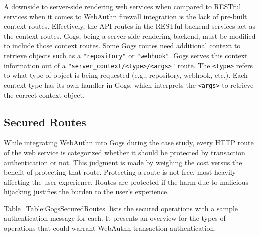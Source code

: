 A downside to server-side rendering web services when compared to RESTful services when it comes to WebAuthn firewall integration is the lack of pre-built context routes. Effectively, the API routes in the RESTful backend services act as the context routes. Gogs, being a server-side rendering backend, must be modified to include those context routes. Some Gogs routes need additional context to retrieve objects such as a \lstinline{"repository"} or \lstinline{"webhook"}. Gogs serves this context information out of a \lstinline{"server_context/<type>/<args>"} route. The \lstinline{<type>} refers to what type of object is being requested (e.g., repository, webhook, etc.). Each context type has its own handler in Gogs, which interprets the \lstinline{<args>} to retrieve the correct context object.


\subsection{Secured Routes}

While integrating WebAuthn into Gogs during the case study, every HTTP route of the web service is categorized whether it should be protected by transaction authentication or not. This judgment is made by weighing the cost versus the benefit of protecting that route. Protecting a route is not free, most heavily affecting the user experience. Routes are protected if the harm due to malicious hijacking justifies the burden to the user's experience.

Table~\ref{Table:GogsSecuredRoutes} lists the secured operations with a sample authentication message for each. It presents an overview for the types of operations that could warrant WebAuthn transaction authentication.


